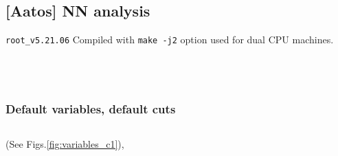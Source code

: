\subsection{[Aatos] NN analysis}

{\tt root\_v5.21.06}
Compiled with {\tt make -j2} option used for dual CPU machines.

\scriptsize
\begin{verbatim}

\end{verbatim}
\normalsize

\scriptsize
\begin{verbatim}
\end{verbatim}
\normalsize

\scriptsize
\begin{verbatim}

\end{verbatim}
\normalsize


\scriptsize
\begin{verbatim}
\end{verbatim}
\normalsize

\subsubsection{Default variables, default cuts}
\scriptsize
\begin{verbatim}

\end{verbatim}
\normalsize

(See Figs.\ref{fig:variables_c1}),
 
